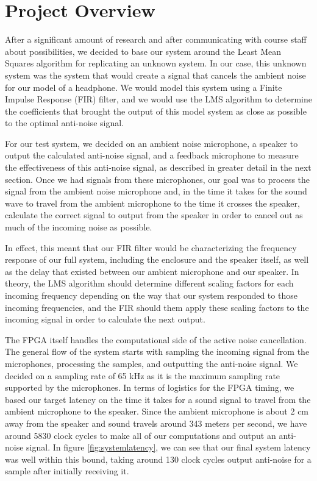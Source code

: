 \documentclass{fpgairpods}
\begin{document}
\section{Project Overview} %
After a significant amount of research and after communicating with course staff about possibilities, we decided to base our system around the Least Mean Squares algorithm for replicating an unknown system. In our case, this unknown system was the system that would create a signal that cancels the ambient noise for our model of a headphone. We would model this system using a Finite Impulse Response (FIR) filter, and we would use the LMS algorithm to determine the coefficients that brought the output of this model system as close as possible to the optimal anti-noise signal.

For our test system, we decided on an ambient noise microphone, a speaker to output the calculated anti-noise signal, and a feedback microphone to measure the effectiveness of this anti-noise signal, as described in greater detail in the next section. Once we had signals from these microphones, our goal was to process the signal from the ambient noise microphone and, in the time it takes for the sound wave to travel from the ambient microphone to the time it crosses the speaker, calculate the correct signal to output from the speaker in order to cancel out as much of the incoming noise as possible.

In effect, this meant that our FIR filter would be characterizing the frequency response of our full system, including the enclosure and the speaker itself, as well as the delay that existed between our ambient microphone and our speaker. In theory, the LMS algorithm should determine different scaling factors for each incoming frequency depending on the way that our system responded to those incoming frequencies, and the FIR should them apply these scaling factors to the incoming signal in order to calculate the next output.

The FPGA itself handles the computational side of the active noise cancellation. The general flow of the system starts with sampling the incoming signal from the microphones, processing the samples, and outputting the anti-noise signal. We decided on a sampling rate of 65 kHz as it is the maximum sampling rate supported by the microphones. In terms of logistics for the FPGA timing, we based our target latency on the time it takes for a sound signal to travel from the ambient microphone to the speaker. Since the ambient microphone is about 2 cm away from the speaker and sound travels around 343 meters per second, we have around 5830 clock cycles to make all of our computations and output an anti-noise signal. In figure \ref{fig:systemlatency}, we can see that our final system latency was well within this bound, taking around 130 clock cycles output anti-noise for a sample after initially receiving it.
\end{document}
